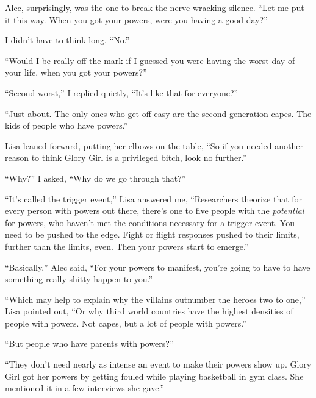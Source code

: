





Alec, surprisingly, was the one to break the nerve-wracking silence. ``Let me put it this way.  When you got your powers, were you having a good day?''



I didn't have to think long. ``No.''



``Would I be really off the mark if I guessed you were having the worst day of your life, when you got your powers?''



``Second worst,'' I replied quietly, ``It's like that for everyone?''



``Just about.  The only ones who get off easy are the second generation capes.  The kids of people who have powers.''



Lisa leaned forward, putting her elbows on the table, ``So if you needed another reason to think Glory Girl is a privileged bitch, look no further.''



``Why?'' I asked, ``Why do we go through that?''



``It's called the trigger event,'' Lisa answered me, ``Researchers theorize that for every person with powers out there, there's one to five people with the \emph{potential} for powers, who haven't met the conditions necessary for a trigger event.  You need to be pushed to the edge.  Fight or flight responses pushed to their limits, further than the limits, even.  Then your powers start to emerge.''



``Basically,'' Alec said, ``For your powers to manifest, you're going to have to have something really shitty happen to you.''



``Which may help to explain why the villains outnumber the heroes two to one,'' Lisa pointed out, ``Or why third world countries have the highest densities of people with powers.  Not capes, but a lot of people with powers.''



``But people who have parents with powers?''



``They don't need nearly as intense an event to make their powers show up.  Glory Girl got her powers by getting fouled while playing basketball in gym class.  She mentioned it in a few interviews she gave.''



